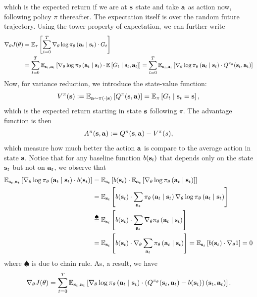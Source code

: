 \documentclass[11pt]{article}  %
\begin{document}
which is the expected return if we are at $\mathbf{s}$ state and take $\mathbf{a}$ as action now, following policy $\pi$ thereafter.
The expectation itself is over the random future trajectory.
Using the tower property of expectation, we can further write 
\begin{align*}
  \nabla_{\theta} J(\theta) &= \mathbb{E}_{\tau}\left[\sum_{t=0}^{T}\nabla_\theta \log \pi_{\theta}\left( \mathbf{a}_t \mid \mathbf{s}_t \right) \cdot G_t\right]\\
  &= \sum_{t=0}^{T}\mathbb{E}_{\mathbf{s}_t, \mathbf{a}_t}\left[\nabla_{\theta} \log\pi_{\theta}\left( \mathbf{a}_t \mid \mathbf{s}_t \right)\cdot\mathbb{E}\left[G_t \mid \mathbf{s}_t, \mathbf{a}_t\right]\right] =  \sum_{t=0}^{T}\mathbb{E}_{\mathbf{s}_t, \mathbf{a}_t}\left[\nabla_{\theta} \log\pi_{\theta}\left( \mathbf{a}_t \mid \mathbf{s}_t \right)\cdot Q^{\pi_\theta}(\mathbf{s}_t, \mathbf{a}_t)\right]
\end{align*}
Now, for variance reduction, we introduce the state-value function:
\begin{align*}
  V^{\pi}(\mathbf{s}) := \mathbb{E}_{\mathbf{a} \sim \pi_{}\left( \cdot \mid \mathbf{s} \right)}\left[Q^{\pi}(\mathbf{s}, \mathbf{a})\right] = \mathbb{E}_{\pi}\left[G_t \mid \mathbf{s}_t = \mathbf{s}\right],
\end{align*}
which is the expected return starting in state $\mathbf{s}$ following $\pi$.
The advantage function is then 
\begin{align*}
  A^{\pi}(\mathbf{s}, \mathbf{a}) := Q^{\pi}(\mathbf{s}, \mathbf{a}) - V^{\pi}(s),
\end{align*}
which measure how much better the action $\mathbf{a}$ is compare to the average action in state $\mathbf{s}$.
Notice that for any baseline function $b(\mathbf{s}_t)$ that depends only on the state $\mathbf{s}_t$ but not on $\mathbf{a}_t$, we observe that 
\begin{align*}
  \mathbb{E}_{\mathbf{s}_t, \mathbf{a}_t}\left[\nabla_\theta \log \pi_{\theta}\left( \mathbf{a}_t \mid \mathbf{s}_t \right) \cdot b(\mathbf{s}_t)\right] &= \mathbb{E}_{\mathbf{s}_t}\left[b(\mathbf{s}_t) \cdot \mathbb{E}_{\mathbf{a}_t}\left[\nabla_\theta \log \pi_{\theta}\left( \mathbf{a}_t \mid \mathbf{s}_t \right)\right]\right] \\
  &= \mathbb{E}_{\mathbf{s}_t}\left[b(\mathbf{s}_t) \cdot \sum_{\mathbf{a}_t}\pi_{\theta}\left( \mathbf{a}_t \mid \mathbf{s}_t \right)\nabla_\theta \log \pi_{\theta}\left( \mathbf{a}_t \mid \mathbf{s}_t \right)\right] \\
  &\overset{\spadesuit}{=} \mathbb{E}_{\mathbf{s}_t}\left[b(\mathbf{s}_t) \cdot \sum_{\mathbf{a}_t}\nabla_\theta \pi_{\theta}\left( \mathbf{a}_t \mid \mathbf{s}_t \right)\right] \\
  &= \mathbb{E}_{\mathbf{s}_t}\left[b(\mathbf{s}_t) \cdot \nabla_\theta \sum_{\mathbf{a}_t} \pi_{\theta}\left( \mathbf{a}_t \mid \mathbf{s}_t \right)\right] = \mathbb{E}_{\mathbf{s}_t}\left[b(\mathbf{s}_t) \cdot \nabla_\theta 1\right] = 0
\end{align*} 
where $\spadesuit$ is due to chain rule.
As, a result, we have 
\begin{align*}
  \nabla_{\theta} J(\theta) = \sum_{t=0}^{T}\mathbb{E}_{\mathbf{s}_t, \mathbf{a}_t}\left[\nabla_{\theta}\log \pi_{\theta}\left( \mathbf{a}_t \mid \mathbf{s}_t \right)\cdot \left( Q^{\pi_\theta}(\mathbf{s}_t, \mathbf{a}_t) - b(\mathbf{s}_t) \right)(\mathbf{s}_t, \mathbf{a}_t)\right].
\end{align*} 
\end{document}
